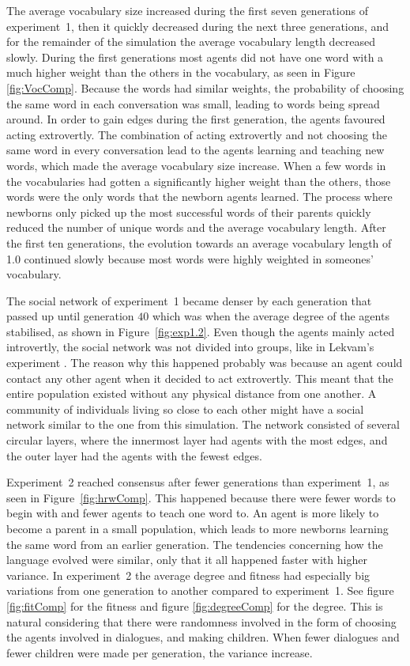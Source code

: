The average vocabulary size increased during the first seven generations of experiment~1, then it quickly decreased during the next three generations, and for the remainder of the simulation the average vocabulary length decreased slowly. During the first generations most agents did not have one word with a much higher weight than the others in the vocabulary, as seen in Figure \ref{fig:VocComp}. Because the words had similar weights, the probability of choosing the same word in each conversation was small, leading to words being spread around. In order to gain edges during the first generation, the agents favoured acting extrovertly. The combination of acting extrovertly and not choosing the same word in every conversation lead to the agents learning and teaching new words, which made the average vocabulary size increase. When a few words in the vocabularies had gotten a significantly higher weight than the others, those words were the only words that the newborn agents learned. The process where newborns only picked up the most successful words of their parents quickly reduced the number of unique words and the average vocabulary length. After the first ten generations, the evolution towards an average vocabulary length of 1.0 continued slowly because most words were highly weighted in someones' vocabulary.
 
The social network of experiment~1 became denser by each generation that passed up until generation $40$ which was when the average degree of the agents stabilised, as shown in Figure~\ref{fig:exp1.2}. Even though the agents mainly acted introvertly, the social network was not divided into groups, like in Lekvam’s experiment \citep[Section 5.1]{lekvam2014co}. The reason why this happened probably was because an agent could contact any other agent when it decided to act extrovertly. This meant that the entire population existed without any physical distance from one another. A community of individuals living so close to each other might have a social network similar to the one from this simulation. The network consisted of several circular layers, where the innermost layer had agents with the most edges, and the outer layer had the agents with the fewest edges.

Experiment~2 reached consensus after fewer generations than experiment~1, as seen in Figure~\ref{fig:hrwComp}. This happened because there were fewer words to begin with and fewer agents to teach one word to. An agent is more likely to become a parent in a small population, which leads to more newborns learning the same word from an earlier generation. The tendencies concerning how the language evolved were similar, only that it all happened faster with higher variance. In experiment~2 the average degree and fitness had especially big variations from one generation to another compared to experiment~1. See figure \ref{fig:fitComp} for the fitness and figure \ref{fig:degreeComp} for the degree. This is natural considering that there were randomness involved in the form of choosing the agents involved in dialogues, and making children. When fewer dialogues and fewer children were made per generation, the variance increase.

